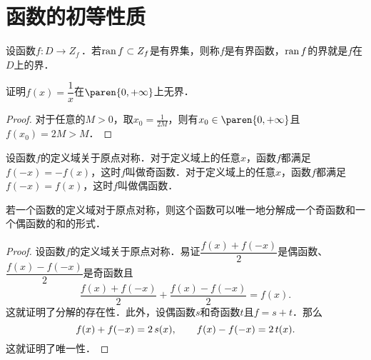 \section{函数的初等性质\label{sec:funcprops}}

\begin{definition*}
  设函数\(f\colon D \to Z_f\)\,．若\(\operatorname{ran} f \subset Z_f\)是有界集，则称\(f\)是有界函数，\(\operatorname{ran} f\)的界就是\(f\)在\(D\)上的界．
\end{definition*}

\begin{example*}
  证明\(f(x) = \dfrac1x\)在\(\paren{0,+\infty}\)上无界．

  \begin{proof}
    对于任意的\(M > 0\)，取\(x_0 = \frac1{2M}\)，则有\(x_0 \in \paren{0,+\infty}\)且\(f(x_0) = 2M > M\)．
  \end{proof}
\end{example*}

\begin{definition*}
  设函数\(f\)的定义域关于原点对称．对于定义域上的任意\(x\)，函数\(f\)都满足\(f(-x) = -f(x)\)，这时\(f\)叫做奇函数．对于定义域上的任意\(x\)，函数\(f\)都满足\(f(-x) = f(x)\)，这时\(f\)叫做偶函数．
\end{definition*}

\hypertarget{T:evenodd}{}
\begin{theorem*}
  若一个函数的定义域对于原点对称，则这个函数可以唯一地分解成一个奇函数和一个偶函数的和的形式．

  \begin{proof}
    设函数\(f\)的定义域关于原点对称．易证\(\dfrac{f(x)+f(-x)}{2}\)是偶函数、\(\dfrac{f(x)-f(-x)}{2}\)是奇函数且
    \[
      \frac{f(x)+f(-x)}{2} + \frac{f(x)-f(-x)}{2} = f(x).
    \]
    这就证明了分解的存在性．此外，设偶函数\(s\)和奇函数\(t\)且\(f = s + t\)．那么
    \[
      f(x) + f(-x) = 2\mathop{\relax\kern0pt s}\nolimits(x),
      \qquad
      f(x) - f(-x) = 2\mathop{\relax\kern0pt t}\nolimits(x).
    \]
    这就证明了唯一性．
  \end{proof}
\end{theorem*}

